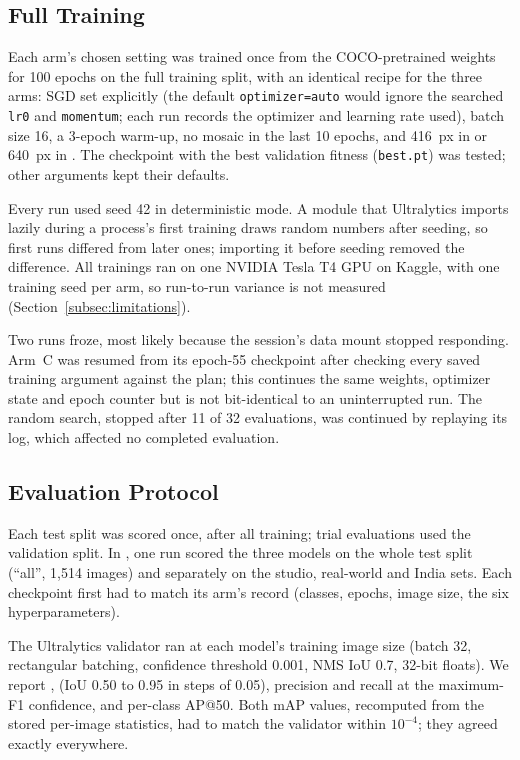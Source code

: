 \subsection{Full Training}
\label{subsec:training}

Each arm's chosen setting was trained once from the COCO-pretrained weights for 100 epochs on the full training split, with an identical recipe for the three arms: SGD set explicitly (the default \texttt{optimizer=auto} would ignore the searched \texttt{lr0} and \texttt{momentum}; each run records the optimizer and learning rate used), batch size 16, a 3-epoch warm-up, no mosaic in the last 10 epochs, and 416~px in \genone or 640~px in \gentwo. The checkpoint with the best validation fitness (\texttt{best.pt}) was tested; other arguments kept their defaults.

Every run used seed 42 in deterministic mode. A module that Ultralytics imports lazily during a process's first training draws random numbers after seeding, so first runs differed from later ones; importing it before seeding removed the difference. All trainings ran on one NVIDIA Tesla T4 GPU on Kaggle, with one training seed per arm, so run-to-run variance is not measured (Section~\ref{subsec:limitations}).

Two \gentwo runs froze, most likely because the session's data mount stopped responding. Arm~C was resumed from its epoch-55 checkpoint after checking every saved training argument against the plan; this continues the same weights, optimizer state and epoch counter but is not bit-identical to an uninterrupted run. The random search, stopped after 11 of 32 evaluations, was continued by replaying its log, which affected no completed evaluation.

\subsection{Evaluation Protocol}
\label{subsec:eval}

Each test split was scored once, after all training; trial evaluations used the validation split. In \gentwo, one run scored the three models on the whole test split (``all'', 1,514 images) and separately on the studio, real-world and India sets. Each checkpoint first had to match its arm's record (classes, epochs, image size, the six hyperparameters).

The Ultralytics validator ran at each model's training image size (batch 32, rectangular batching, confidence threshold 0.001, NMS IoU 0.7, 32-bit floats). We report \mapfifty, \mapfiftyninetyfive (IoU 0.50 to 0.95 in steps of 0.05), precision and recall at the maximum-F1 confidence, and per-class AP@50. Both mAP values, recomputed from the stored per-image statistics, had to match the validator within $10^{-4}$; they agreed exactly everywhere.

